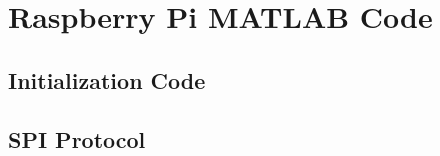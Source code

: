 \chapter{Raspberry Pi MATLAB Code}
\label{ch: AppendixD}

\section{Initialization Code}
\label{ch:RPI3_SPI_Int}


\section{SPI Protocol}
\label{ch:RPI3_SPI_Int}



